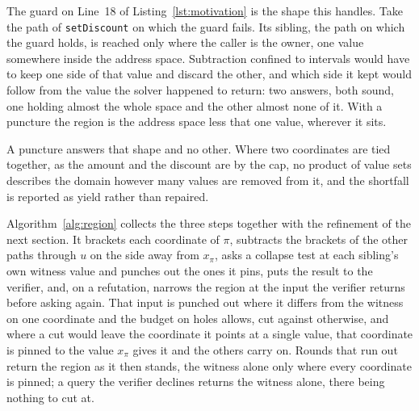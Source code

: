 \documentclass[manuscript,anonymous]{acmart}
\begin{document}
The guard on Line~18 of Listing~\ref{lst:motivation} is the shape this handles.
Take the path of \texttt{setDiscount} on which the guard fails. Its sibling, the
path on which the guard holds, is reached only where the caller is the owner,
one value somewhere inside the address space. Subtraction confined to intervals
would have to keep one side of that value and discard the other, and which side
it kept would follow from the value the solver happened to return: two answers,
both sound, one holding almost the whole space and the other almost none of it.
With a puncture the region is the address space less that one value, wherever it
sits.

A puncture answers that shape and no other. Where two coordinates are tied
together, as the amount and the discount are by the cap, no product of value
sets describes the domain however many values are removed from it, and the
shortfall is reported as yield rather than repaired.

Algorithm~\ref{alg:region} collects the three steps together with the
refinement of the next section. It brackets each coordinate of $\pi$, subtracts
the brackets of the other paths through $u$ on the side away from $x_\pi$,
asks a collapse test at each sibling's own witness value and punches out the
ones it pins, puts the result to the verifier,
and, on a refutation, narrows the region at the input the verifier returns
before asking again. That input is punched out where it differs from the witness
on one coordinate and the budget on holes allows, cut against otherwise, and
where a cut would leave the coordinate it points at a single value, that
coordinate is pinned to the value $x_\pi$ gives it and the others carry on. Rounds that run out return the region as it then stands, the witness
alone only where every coordinate is pinned; a query the verifier declines
returns the witness alone, there being nothing to cut at.
\end{document}
